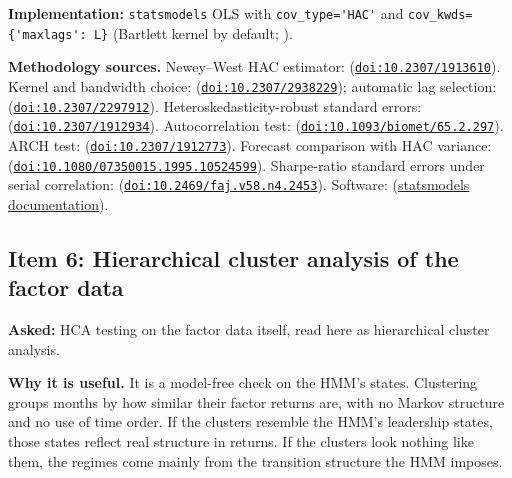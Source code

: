 \documentclass[11pt]{article}
\newcommand{\doi}[1]{\href{https://doi.org/#1}{\nolinkurl{doi:#1}}}
\begin{document}
\textbf{Implementation:} \texttt{statsmodels} OLS with \verb|cov_type='HAC'| and \verb|cov_kwds={'maxlags': L}| (Bartlett kernel by default; \citealp{statsmodels_hac}).

\textbf{Methodology sources.} Newey--West HAC estimator: \citet{newey1987} (\doi{10.2307/1913610}). Kernel and bandwidth choice: \citet{andrews1991} (\doi{10.2307/2938229}); automatic lag selection: \citet{newey1994} (\doi{10.2307/2297912}). Heteroskedasticity-robust standard errors: \citet{white1980} (\doi{10.2307/1912934}). Autocorrelation test: \citet{ljung1978} (\doi{10.1093/biomet/65.2.297}). ARCH test: \citet{engle1982} (\doi{10.2307/1912773}). Forecast comparison with HAC variance: \citet{diebold1995} (\doi{10.1080/07350015.1995.10524599}). Sharpe-ratio standard errors under serial correlation: \citet{lo2002} (\doi{10.2469/faj.v58.n4.2453}). Software: \citet{statsmodels_hac} (\href{https://www.statsmodels.org/stable/generated/statsmodels.regression.linear_model.RegressionResults.get_robustcov_results.html}{statsmodels documentation}).

\subsection{Item 6: Hierarchical cluster analysis of the factor data}\label{sec:hca}
\textbf{Asked:} HCA testing on the factor data itself, read here as hierarchical cluster analysis.

\textbf{Why it is useful.} It is a model-free check on the HMM's states. Clustering groups months by how similar their factor returns are, with no Markov structure and no use of time order. If the clusters resemble the HMM's leadership states, those states reflect real structure in returns. If the clusters look nothing like them, the regimes come mainly from the transition structure the HMM imposes.
\end{document}
